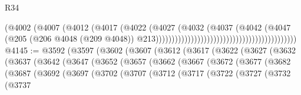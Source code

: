 \begin{lexlean}{R34}
\begin{coremodule}
                                                                      (@4002
                                                                        (@4007
                                                                          (@4012
                                                                            (@4017
                                                                              (@4022
                                                                                (@4027
                                                                                  (@4032
                                                                                    (@4037
                                                                                      (@4042
                                                                                        (@4047
                                                                                          (@205
                                                                                            (@206
                                                                                              @4048
                                                                                              (@209
                                                                                                @4048))
                                                                                            @213))))))))))))))))))))))))))))))))))))))))))))
@4145 := @3592
    (@3597
      (@3602
        (@3607
          (@3612
            (@3617
              (@3622
                (@3627
                  (@3632
                    (@3637
                      (@3642
                        (@3647
                          (@3652
                            (@3657
                              (@3662
                                (@3667
                                  (@3672
                                    (@3677
                                      (@3682
                                        (@3687
                                          (@3692
                                            (@3697
                                              (@3702
                                                (@3707
                                                  (@3712
                                                    (@3717
                                                      (@3722
                                                        (@3727
                                                          (@3732
                                                            (@3737

\end{coremodule}
\end{lexlean}
